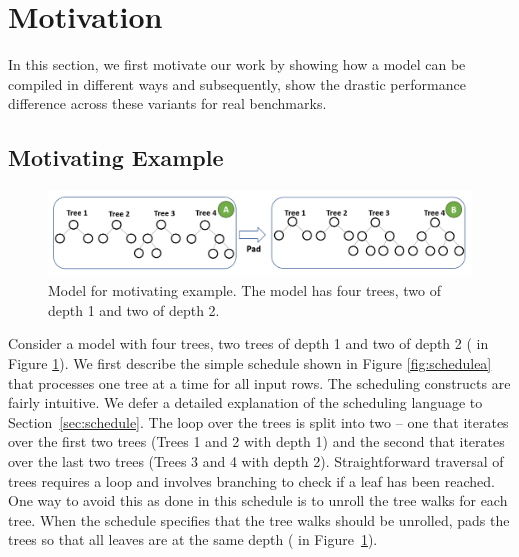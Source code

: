 \section{Motivation}
\label{sec:motivation}
In this section, we first motivate our work by showing how a model can be compiled in different ways
and subsequently, show the drastic performance difference across these variants for real benchmarks.

\subsection{Motivating Example}
\begin{figure}[htb]
  \centering
  \includegraphics[width=\linewidth]{figures/HIR.PNG}
  \caption{Model for motivating example. The model has four trees, two of depth 1 and two of depth 2.}
  \label{Fig:HIRExample}
\end{figure}

Consider a model with four trees, two 
trees of depth 1 and two of depth 2 ( in Figure \ref{Fig:HIRExample}).
We first describe the simple schedule shown in Figure \ref{fig:schedulea} that processes one tree at a time 
for all input rows. The scheduling constructs are fairly intuitive. We 
defer a detailed explanation of the scheduling language to Section~\ref{sec:schedule}. 
The loop over the trees is split into two -- one that
iterates over the first two trees (Trees 1 and 2 with depth 1) and 
the second that iterates over the last two trees (Trees 3 and 4 with
depth 2). Straightforward traversal of trees requires a  loop
and involves branching to check if a leaf has been reached. 
One way to avoid this as done in this schedule is to unroll the 
tree walks for each tree. 
When the schedule specifies that the tree walks should be unrolled, 
\Treebeard{} pads the trees so that all leaves are at the same depth
( in Figure~\ref{Fig:HIRExample}). 

